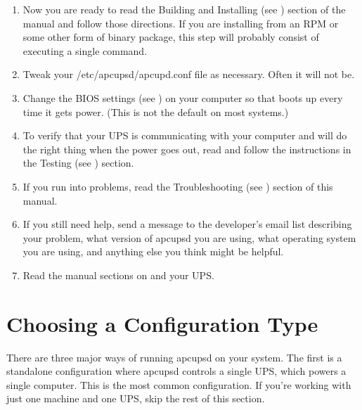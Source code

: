 \begin{enumerate}
\item Now you are ready to read the Building and Installing (see 
   ) section of the manual
and follow those directions.  If you are installing from an RPM or some other
form of binary package, this step will probably consist of executing a single
command.  
\item Tweak your /etc/apcupsd/apcupd.conf file as necessary. Often it will not
   be.  
\item Change the BIOS settings (see 
   ) on your computer
so that boots up every time it gets power. (This is not the default on most
systems.)  
\item To verify that your UPS is communicating with your computer and will do
   the right thing when the power goes out, read and follow the instructions in
   the Testing (see 
) section.  
\item If you run into problems, read the Troubleshooting (see 
   ) section of this
manual.  
\item If you still need help, send a message to the developer's email list 
    describing your problem, what version of apcupsd you
are using, what operating system you are using, and anything else you think
might be helpful.  
\item Read the manual sections on 
    and 
    your UPS.  
\end{enumerate}





\label{Choosing-a-Configuration-Type}
\label{index-Choosing-a-Configuration-Type-13}
\label{index-Configuration-Type-14}
\section*{Choosing a Configuration Type}
There are three major ways of running apcupsd on your system. The first is a
standalone configuration where apcupsd controls a single UPS, which powers a
single computer.  This is the most common configuration.  If you're working
with just one machine and one UPS, skip the rest of this section.  

